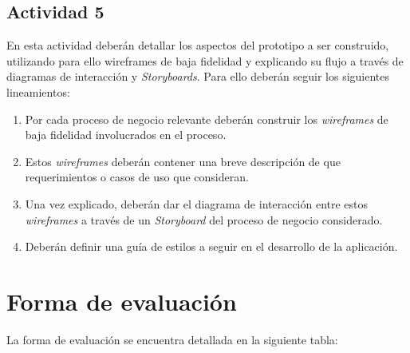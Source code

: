 \documentclass[]{article}
\begin{document}
\subsection{Actividad 5}

En esta actividad deberán detallar los aspectos del prototipo a ser construido, utilizando para ello wireframes de baja fidelidad y explicando su flujo a través de diagramas de interacción y \textit{Storyboards}. Para ello deberán seguir los siguientes
lineamientos:

\begin{enumerate}
    \item Por cada proceso de negocio relevante deberán construir los \textit{wireframes} de baja fidelidad involucrados en el proceso.
    \item Estos \textit{wireframes} deberán contener una breve descripción de que requerimientos o casos de uso que consideran.
    \item Una vez explicado, deberán dar el diagrama de interacción entre estos \textit{wireframes} a través de un \textit{Storyboard} del proceso de negocio considerado.
    \item Deberán definir una guía de estilos a seguir en el desarrollo de la aplicación.
\end{enumerate}

\section{Forma de evaluación}

La forma de evaluación se encuentra detallada en la siguiente tabla:
\end{document}
